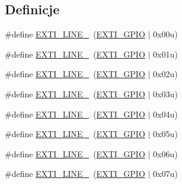 \subsection*{Definicje}
\begin{DoxyCompactItemize}
\item 
\#define \hyperlink{group___e_x_t_i___line_gac1a9cd58d76e9f497abecc832e3294c8}{E\+X\+T\+I\+\_\+\+L\+I\+N\+E\+\_}~(\hyperlink{group___e_x_t_i___private___constants_gacfa322960fc87db022536119cabb4d2a}{E\+X\+T\+I\+\_\+\+G\+P\+IO}       $\vert$ 0x00u)
\item 
\#define \hyperlink{group___e_x_t_i___line_gaf64b8deca0cf44b4c58d2b4d0fcd2177}{E\+X\+T\+I\+\_\+\+L\+I\+N\+E\+\_}~(\hyperlink{group___e_x_t_i___private___constants_gacfa322960fc87db022536119cabb4d2a}{E\+X\+T\+I\+\_\+\+G\+P\+IO}       $\vert$ 0x01u)
\item 
\#define \hyperlink{group___e_x_t_i___line_gaec48b88f5279b95962682300c0650840}{E\+X\+T\+I\+\_\+\+L\+I\+N\+E\+\_}~(\hyperlink{group___e_x_t_i___private___constants_gacfa322960fc87db022536119cabb4d2a}{E\+X\+T\+I\+\_\+\+G\+P\+IO}       $\vert$ 0x02u)
\item 
\#define \hyperlink{group___e_x_t_i___line_ga7e223d61dcb2b538040824c0b491d68c}{E\+X\+T\+I\+\_\+\+L\+I\+N\+E\+\_}~(\hyperlink{group___e_x_t_i___private___constants_gacfa322960fc87db022536119cabb4d2a}{E\+X\+T\+I\+\_\+\+G\+P\+IO}       $\vert$ 0x03u)
\item 
\#define \hyperlink{group___e_x_t_i___line_gaf8e1e94adf29806583e68170c1dad7dd}{E\+X\+T\+I\+\_\+\+L\+I\+N\+E\+\_}~(\hyperlink{group___e_x_t_i___private___constants_gacfa322960fc87db022536119cabb4d2a}{E\+X\+T\+I\+\_\+\+G\+P\+IO}       $\vert$ 0x04u)
\item 
\#define \hyperlink{group___e_x_t_i___line_gab7859f0b07e671f71be61d7d301eb909}{E\+X\+T\+I\+\_\+\+L\+I\+N\+E\+\_}~(\hyperlink{group___e_x_t_i___private___constants_gacfa322960fc87db022536119cabb4d2a}{E\+X\+T\+I\+\_\+\+G\+P\+IO}       $\vert$ 0x05u)
\item 
\#define \hyperlink{group___e_x_t_i___line_gaebcb8302f9aae1d54c7aada7ade230c0}{E\+X\+T\+I\+\_\+\+L\+I\+N\+E\+\_}~(\hyperlink{group___e_x_t_i___private___constants_gacfa322960fc87db022536119cabb4d2a}{E\+X\+T\+I\+\_\+\+G\+P\+IO}       $\vert$ 0x06u)
\item 
\#define \hyperlink{group___e_x_t_i___line_ga32a33e800bf0f754d0337ab30abde810}{E\+X\+T\+I\+\_\+\+L\+I\+N\+E\+\_}~(\hyperlink{group___e_x_t_i___private___constants_gacfa322960fc87db022536119cabb4d2a}{E\+X\+T\+I\+\_\+\+G\+P\+IO}       $\vert$ 0x07u)

\end{DoxyCompactItemize}
